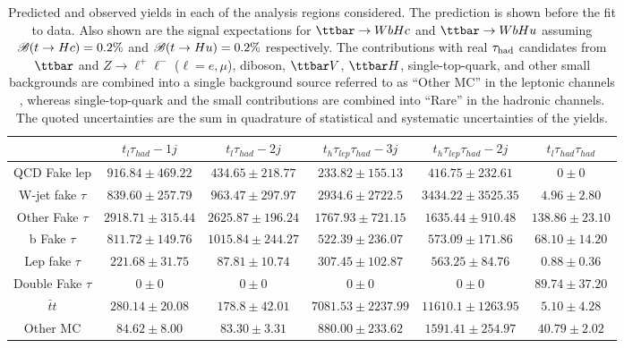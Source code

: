\begin{table}[htbp]
\caption{
Predicted and observed yields in each of the analysis regions considered.
The prediction is shown before the fit to data. Also shown are the signal expectations for 
$\Hc$ and $\Hu$ assuming $\mathscr{B}(t\to Hc)=0.2\%$ and $\mathscr{B}(t\to Hu)=0.2\%$ respectively.
The contributions with real $\tau_{\mathrm{had}}$ candidates from $\ttbar$ and  $Z\to \ell^+\ell^-$ ($\ell = e, \mu$), diboson, $\ttbar V$, $\ttbar H$, single-top-quark, and other small backgrounds are combined into
a single background source referred to as ``Other MC'' in the leptonic channels , whereas single-top-quark and the small contributions are combined into ``Rare'' in the hadronic channels.  
The quoted uncertainties are the sum in quadrature of statistical and systematic uncertainties of the yields.}
\small
\centering
\begin{tabular}{|c|c|c|c|c|c|}
\hline 
 & $t_{l}\tau_{had}-1j$ & $t_{l}\tau_{had}-2j$ & $t_{h}\tau_{lep}\tau_{had}-3j$ & $t_{h}\tau_{lep}\tau_{had}-2j$ & $t_{l}\tau_{had}\tau_{had}$\\\hline 
  QCD Fake lep  & $916.84 \pm 469.22$ & $434.65 \pm 218.77$ & $233.82 \pm 155.13$ & $416.75 \pm 232.61$ & $0 \pm 0$ \\ 
  W-jet fake $\tau$   & $839.60 \pm 257.79$ & $963.47 \pm 297.97$ & $2934.6 \pm 2722.5$ & $3434.22 \pm 3525.35$ & $4.96 \pm 2.80$ \\ 
  Other Fake $\tau$   & $2918.71 \pm 315.44$ & $2625.87 \pm 196.24$ & $1767.93 \pm 721.15$ & $1635.44 \pm 910.48$ & $138.86 \pm 23.10$ \\ 
  b Fake $\tau$   & $811.72 \pm 149.76$ & $1015.84 \pm 244.27$ & $522.39 \pm 236.07$ & $573.09 \pm 171.86$ & $68.10 \pm 14.20$ \\ 
  Lep fake $\tau$    & $221.68 \pm 31.75$ & $87.81 \pm 10.74$ & $307.45 \pm 102.87$ & $563.25 \pm 84.76$ & $0.88 \pm 0.36$ \\ 
  Double Fake $\tau$    & $0 \pm 0$ & $0 \pm 0$ & $0 \pm 0$ & $0 \pm 0$ & $89.74 \pm 37.20$ \\ 
  $\bar{t}t$   & $280.14 \pm 20.08$ & $178.8 \pm 42.01$ & $7081.53 \pm 2237.99$ & $11610.1 \pm 1263.95$ & $5.10 \pm 4.28$ \\ 
  Other MC   & $84.62 \pm 8.00$ & $83.30 \pm 3.31$ & $880.00 \pm 233.62$ & $1591.41 \pm 254.97$ & $40.79 \pm 2.02$ \\\hline

\end{tabular}
\end{table}
